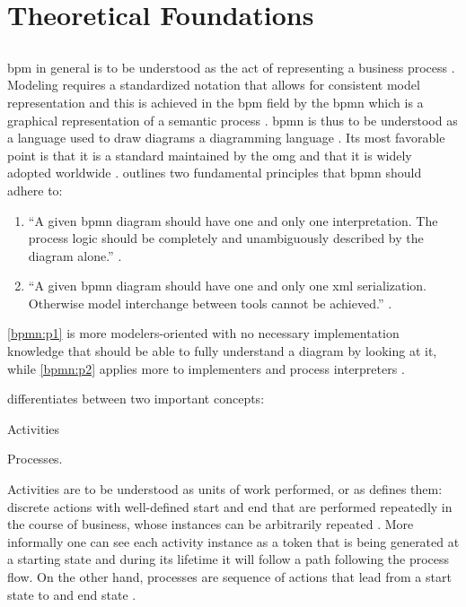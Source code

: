 \chapter{Theoretical Foundations}
\label{ch:foundations}

\section{}
\label{sec:wfms}

\gls{bpm} in general is to be understood as the act of representing a business process \citep{Silver2011}. Modeling requires a standardized notation that allows for consistent model representation and this is achieved in the \gls{bpm} field by the \gls{bpmn} which is a graphical representation of a semantic process \citep{Silver2011}. \gls{bpmn} is thus to be understood as a language used to draw diagrams \ie a diagramming language \citep{Silver2011}. Its most favorable point is that it is a standard maintained by the \gls{omg} and that it is widely adopted worldwide \citep{Silver2011}. \citet{Silver2011} outlines two fundamental principles that \gls{bpmn} should adhere to:

\begin{enumerate}[label=\textbf{P. \Roman*},ref=Principle \Roman*]
 	\item ``A given \gls{bpmn} diagram should have one and only one interpretation. The process logic should be completely and unambiguously described by the diagram alone.'' \citep[p. v]{Silver2011}. \label{bpmn:p1}
 	\item ``A given \gls{bpmn} diagram should have one and only one \gls{xml} serialization. Otherwise model interchange between tools cannot be achieved.'' \citep[p. v]{Silver2011}. \label{bpmn:p2}
\end{enumerate} 

\ref{bpmn:p1} is more modelers-oriented with no necessary implementation knowledge that should be able to fully understand a diagram by looking at it, while \ref{bpmn:p2} applies more to implementers and process interpreters \citep{Silver2011}.

\citet{Silver2011} differentiates between two important concepts:
\begin{enumerate*}
	\item Activities
	\item Processes.
\end{enumerate*}

Activities are to be understood as units of work performed, or as \citet{Silver2011} defines them: discrete actions with well-defined start and end that are performed repeatedly in the course of business, whose instances can be arbitrarily repeated \citep[p. 10]{Silver2011}. More informally one can see each activity instance as a token that is being generated at a starting state and during its lifetime it will follow a path following the process flow. On the other hand, processes are sequence of actions that lead from a start state to and end state \citep[p. 11]{Silver2011}.

